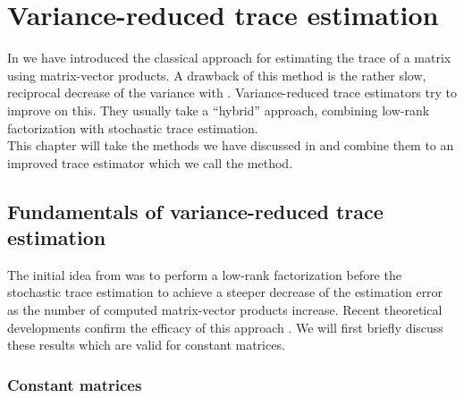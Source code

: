 \chapter{Variance-reduced trace estimation}
\label{chp:4-nystromchebyshev}

In  we have introduced the
classical approach for estimating the trace of a matrix using matrix-vector
products. A drawback of this method is the rather slow, reciprocal decrease of
the variance with . Variance-reduced trace estimators
try to improve on this. They usually take a \enquote{hybrid} approach, combining
low-rank factorization with stochastic trace estimation.\\

This chapter will take the methods we have discussed in 
and  combine them to an improved trace estimator which
we call the  method.


\section{Fundamentals of variance-reduced trace estimation}
\label{sec:4-nystromchebyshev-hybrid}

The initial idea from \cite{lin2017randomized} was to perform a low-rank
factorization before the stochastic trace estimation to achieve a
steeper decrease of the estimation error as the number of computed
matrix-vector products increase. Recent theoretical developments confirm the
efficacy of this approach \cite{meyer2021hutch,persson2022hutch}.
We will first briefly discuss these results which are valid 
for constant matrices.\\


\subsection{Constant matrices}
\label{subsec:4-nystromchebyshev-reduction-constant-matrices}

